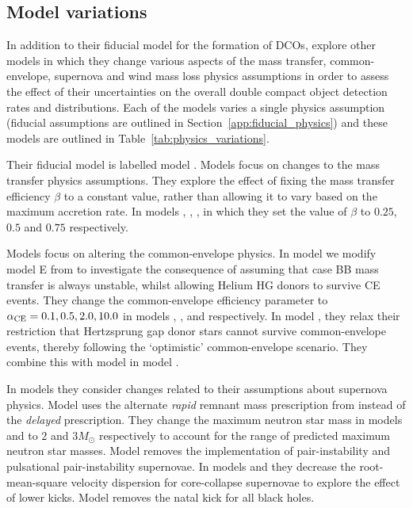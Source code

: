 \subsection{Model variations} \label{sec:variation_assumptions}
In addition to their fiducial model for the formation of DCOs, \citet{Broekgaarden+2021,Broekgaarden+2021b} explore \nMinusOneModels{} other models in which they change various aspects of the mass transfer, common-envelope, supernova and wind mass loss physics assumptions in order to assess the effect of their uncertainties on the overall double compact object detection rates and distributions. Each of the models varies a single physics assumption (fiducial assumptions are outlined in Section~\ref{app:fiducial_physics}) and these models are outlined in Table~\ref{tab:physics_variations}.

Their fiducial model is labelled model \modFid{}. Models \modRangeMT{} focus on changes to the mass transfer physics assumptions. They explore the effect of fixing the mass transfer efficiency $\beta$ to a constant value, rather than allowing it to vary based on the maximum accretion rate. In models \modBetaLow{}, \modBetaMed{}, \modBetaHigh{}, in which they set the value of $\beta$ to $0.25$, $0.5$ and $0.75$ respectively.

Models \modRangeCE{} focus on altering the common-envelope physics. In model \modCaseBB{} we modify model E from \citet{Broekgaarden+2021,Broekgaarden+2021b} to investigate the consequence of assuming that case BB mass transfer is always unstable, whilst allowing Helium HG donors to survive CE events. They change the common-envelope efficiency parameter to $\alpha_{\rm CE} = 0.1, 0.5, 2.0, 10.0$ in models \modAlphaLowest{}, \modAlphaLow{}, \modAlphaHigh{} and \modAlphaHighest{} respectively. In model \modOpt{}, they relax their restriction that Hertzsprung gap donor stars cannot survive common-envelope events, thereby following the `optimistic' common-envelope scenario. They combine this with model \modCaseBB{} in model \modCaseBBOpt{}.

In models \modRangeSN{} they consider changes related to their assumptions about supernova physics. Model \modRapid{} uses the alternate \textit{rapid} remnant mass prescription from \citet{Fryer+2012} instead of the \textit{delayed} prescription. They change the maximum neutron star mass in models \modNSLow{} and \modNSHigh{} to $2$ and $3 \unit{M_{\odot}}$ respectively to account for the range of predicted maximum neutron star masses. Model \modNoPISN{} removes the implementation of pair-instability and pulsational pair-instability supernovae. In models \modSigLow{} and \modSigLower{} they decrease the root-mean-square velocity dispersion for core-collapse supernovae to explore the effect of lower kicks. Model \modNoBH{} removes the natal kick for all black holes.

